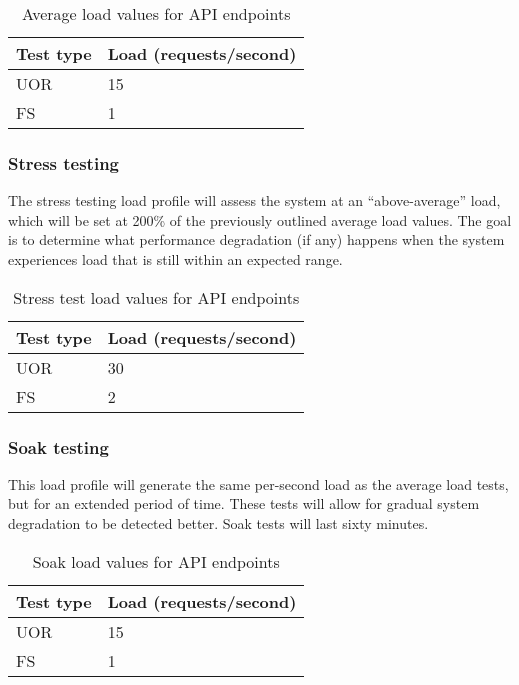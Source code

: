 \begin{table}[h]
    \centering
    \begin{tabularx}{\textwidth}{|X|X|}
        \hline
        \textbf{Test type} & \textbf{Load (requests/second)}  \\ \hline
        UOR & 15 \\ \hline
        FS & 1 \\ \hline
    \end{tabularx}
    \caption{Average load values for API endpoints}
    \label{table:test-average-load-plan}
\end{table}

\subsubsection{Stress testing}

The stress testing load profile will assess the system at an ``above-average'' load, which will be set at 200\% of the previously outlined average load values. The goal is to determine what performance degradation (if any) happens when the system experiences load that is still within an expected range.

\begin{table}[h]
    \centering
    \begin{tabularx}{\textwidth}{|X|X|}
        \hline
        \textbf{Test type} & \textbf{Load (requests/second)}  \\ \hline
        UOR & 30 \\ \hline
        FS & 2 \\ \hline
    \end{tabularx}
    \caption{Stress test load values for API endpoints}
    \label{table:test-stress-load-plan}
\end{table}

\subsubsection{Soak testing}

This load profile will generate the same per-second load as the average load tests, but for an extended period of time. These tests will allow for gradual system degradation to be detected better. Soak tests will last sixty minutes.

\begin{table}[h]
    \centering
    \begin{tabularx}{\textwidth}{|X|X|}
        \hline
        \textbf{Test type} & \textbf{Load (requests/second)}  \\ \hline
        UOR & 15 \\ \hline
        FS & 1 \\ \hline
    \end{tabularx}
    \caption{Soak load values for API endpoints}
    \label{table:test-soak-load-plan}
\end{table}

